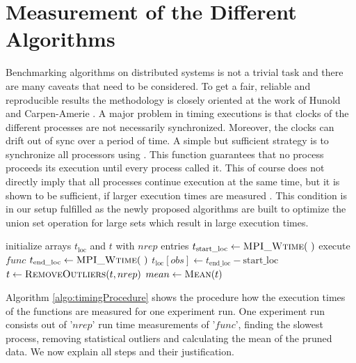 \section{Measurement of the Different Algorithms} \label{sec:benchmarkingProcess}
Benchmarking algorithms on distributed systems is not a trivial task and there are many caveats that need to be considered. To get a fair, reliable and reproducible results the methodology is closely oriented at the work of Hunold and Carpen-Amerie \cite{HunoldBench}. A major problem in timing executions is that clocks of the different processes are not necessarily synchronized. Moreover, the clocks can drift out of sync over a period of time. A simple but sufficient strategy is to synchronize all processors using . This function guarantees that no process proceeds its execution until every process called it. This of course does not directly imply that all processes continue execution at the same time, but it is shown to be sufficient, if larger execution times are measured \cite{HunoldBarrier}. This condition is in our setup fulfilled as the newly proposed algorithms are built to optimize the union set operation for large sets which result in large execution times.\\
\begin{algorithm}
	\caption{– Measurement run of a function\\
		\textit{params}: Experiment parameter\\
		\textit{func}: Tested function\\
		\textit{nrep}: Number of executions}
	\label{algo:timingProcedure}
	\begin{algorithmic}[1]
		\State initialize arrays $t_\mathrm{loc}$ and $t$ with $nrep$ entries
		\State{}
		\State {}
		\State  $t_\mathrm{start\_loc} \gets \Call{MPI\_Wtime}{~}$
		\State execute $func$
		\State  $t_\mathrm{end\_loc} \gets \Call{MPI\_Wtime}{~}$
		\State $t_\mathrm{loc}[obs] \gets t_\mathrm{end\_loc} - \mathrm{start\_loc}$
		\EndFor
		\State {}
		\State $t\gets \Call{RemoveOutliers}{t, nrep}$
		\State $mean \gets \Call{Mean}{t}$ 
		\State {}
		\EndProcedure
	\end{algorithmic}
\end{algorithm}
Algorithm \ref{algo:timingProcedure} shows the procedure how the execution times of the functions are measured for one experiment run. One experiment run consists out of '$nrep$' run time measurements of '$func$', finding the slowest process, removing statistical outliers and calculating the mean of the pruned data. We now explain all steps and their justification.\\
